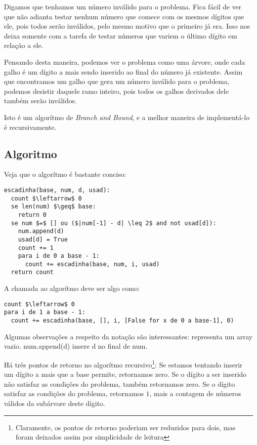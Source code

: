 \documentclass[12pt]{article}
\begin{document}
Digamos que tenhamos um número inválido para o problema. Fica fácil de ver que não adianta testar nenhum número que comece com os mesmos dígitos que ele, pois todos serão inválidos, pelo mesmo motivo que o primeiro já era. Isso nos deixa somente com a tarefa de testar números que variem o último dígito em relação a ele.

Pensando desta maneira, podemos ver o problema como uma árvore, onde cada galho é um dígito a mais sendo inserido ao final do número já existente. Assim que encontramos um galho que gera um número inválido para o problema, podemos desistir daquele ramo inteiro, pois todos os galhos derivados dele também serão inválidos.

Isto é um algorítmo de {\em Branch and Bound}, e a melhor maneira de implementá-lo é recursivamente.

\subsection{Algoritmo}\label{section:terceira:algoritmo}
Veja que o algorítmo é bastante conciso:

\begin{lstlisting}
escadinha(base, num, d, usad):
  count $\leftarrow$ 0
  se len(num) $\geq$ base:
    return 0
  se num $=$ [] ou ($|num[-1] - d| \leq 2$ and not usad[d]):
    num.append(d)
    usad[d] = True
    count += 1
    para i de 0 a base - 1:
      count += escadinha(base, num, i, usad)
  return count
\end{lstlisting}

A chamada ao algorítmo deve ser algo como:
\begin{lstlisting}
count $\leftarrow$ 0
para i de 1 a base - 1:
  count += escadinha(base, [], i, [False for x de 0 a base-1], 0)
\end{lstlisting}

Algumas observações a respeito da notação são interessantes: {\sf []} representa um array vazio. {\sf num.append(d)} insere {\sf d} no final de {\sf num}.

Há três pontos de retorno no algorítmo recursivo\footnote{Claramente, os pontos de retorno poderiam ser reduzidos para dois, mas foram deixados assim por simplicidade de leitura}: Se estamos tentando inserir um dígito a mais que a base permite, retornamos zero. Se o dígito a ser inserido não satisfaz as condições do problema, também retornamos zero. Se o dígito satisfaz as condições do problema, retornamos $1$, mais a contagem de números válidos da subárvore deste dígito.
\end{document}
